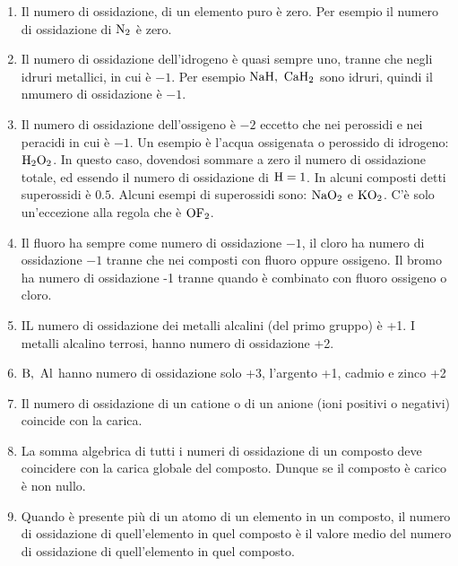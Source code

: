 \documentclass[../AppuntiChimica]{subfiles}
\begin{document}
	\begin{enumerate}
		\item  Il numero di ossidazione, di un elemento puro è zero.  Per esempio il numero di ossidazione di $ \text{N}_{2} $ è zero.
		\item Il numero di ossidazione dell'idrogeno è quasi sempre uno, tranne che negli idruri metallici, in cui è $ -1 $. Per esempio $ \chem{NaH},\ \chem{CaH}_{2} $ sono idruri, quindi il nmumero di ossidazione è $ -1 $.
		\item Il numero di ossidazione dell'ossigeno è $ -2 $ eccetto che nei perossidi e nei peracidi in cui è $ -1 $. Un esempio è l'acqua ossigenata o perossido di idrogeno: $ \text{H}_{2}\text{O}_{2} $. In questo caso, dovendosi sommare a zero il numero di ossidazione totale, ed essendo il numero di ossidazione di $ \text{H}=1 $. In alcuni composti detti superossidi è $ 0.5 $. Alcuni esempi di superossidi sono: $ \text{NaO}_{2} $ e $ \text{KO}_{2} $. C'è solo un'eccezione alla regola che è $ \text{OF}_{2} $.
		\item Il fluoro ha sempre come numero di ossidazione $ -1 $, il cloro ha numero di ossidazione $ -1 $ tranne che nei composti con fluoro oppure ossigeno. Il bromo ha numero di ossidazione -1 tranne quando è combinato con fluoro ossigeno o cloro.
		\item IL numero di ossidazione dei metalli alcalini (del primo gruppo) è +1. I metalli alcalino terrosi, hanno numero di ossidazione +2.
		\item $ \text{B},\ \text{Al} $ hanno numero di ossidazione solo +3, l'argento +1, cadmio e zinco +2
		\item Il numero di ossidazione di un catione o di un anione (ioni positivi o negativi) coincide con la carica. 
		\item La somma algebrica di tutti i numeri di ossidazione di un composto deve coincidere con la carica globale del composto. Dunque se il composto è carico è non nullo.
		\item Quando è presente più di un atomo di un elemento in un composto, il numero di ossidazione di quell'elemento in quel composto è il valore medio del numero di ossidazione di quell'elemento in quel composto. 
	\end{enumerate}
\end{document}
